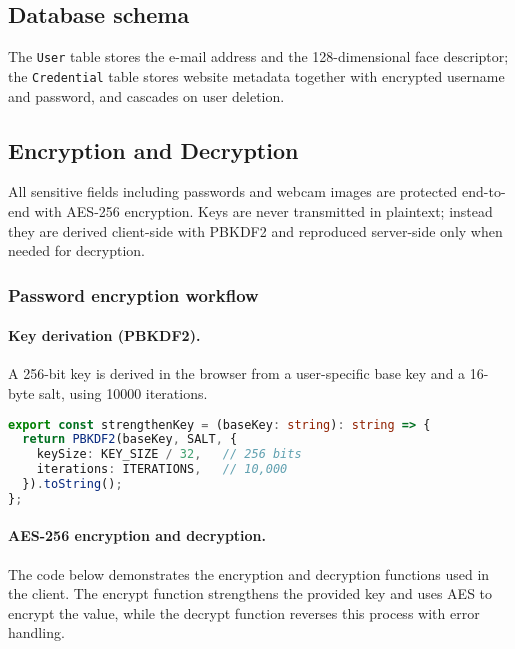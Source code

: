\subsection{Database schema}
The \texttt{User} table stores the e-mail address and the 128-dimensional face descriptor; the \texttt{Credential} table stores website metadata together with encrypted username and password, and cascades on user deletion.


\subsection{Encryption and Decryption}\label{subsec:encryption}

All sensitive fields including passwords and webcam images are protected end-to-end with AES-256 encryption.
Keys are never transmitted in plaintext; instead they are derived client-side with PBKDF2 and reproduced server-side only when needed for decryption.

\subsubsection{Password encryption workflow}

\paragraph{Key derivation (PBKDF2).}
A 256-bit key is derived in the browser from a user-specific base key and a 16-byte salt, using 10000 iterations.

\begin{lstlisting}[language=TypeScript, caption={Key derivation function using PBKDF2}, label={lst:strengthen-key}]
export const strengthenKey = (baseKey: string): string => {
  return PBKDF2(baseKey, SALT, {
    keySize: KEY_SIZE / 32,   // 256 bits
    iterations: ITERATIONS,   // 10,000
  }).toString();
};
\end{lstlisting}

\paragraph{AES-256 encryption and decryption.}
The code below demonstrates the encryption and decryption functions used in the client. The encrypt function strengthens the provided key and uses AES to encrypt the value, while the decrypt function reverses this process with error handling.

